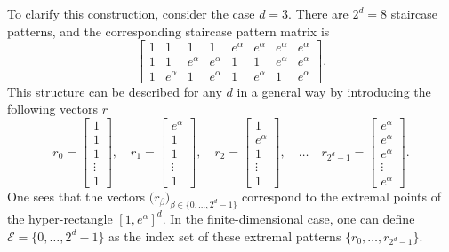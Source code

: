 \documentclass[a4paper, 11pt]{article}
\theoremstyle{definition}
\begin{document}
{To clarify this construction, consider the case $d = 3$. There are $2^d = 8$ staircase patterns, and the corresponding staircase pattern matrix is
\[
\begin{bmatrix}
1 & 1 & 1 & 1 & e^\alpha & e^\alpha & e^\alpha & e^\alpha \\
1 & 1 & e^\alpha & e^\alpha & 1 & 1 & e^\alpha & e^\alpha \\
1 & e^\alpha & 1 & e^\alpha & 1 & e^\alpha & 1 & e^\alpha
\end{bmatrix}.
\]
This structure can be described for any $d$ in a general way by introducing the following vectors $r$
\begin{equation}\label{eq: R_matrix_by_slice}
    r_0 = \begin{bmatrix} 1 \\ 1 \\ 1 \\ \vdots \\ 1 \end{bmatrix}, \quad
    r_1 = \begin{bmatrix} e^\alpha \\ 1 \\ 1 \\ \vdots \\ 1 \end{bmatrix}, \quad
    r_2 = \begin{bmatrix} 1 \\ e^\alpha \\ 1 \\ \vdots \\ 1 \end{bmatrix}, \quad \dots \quad
    r_{2^d - 1} = \begin{bmatrix} e^\alpha \\ e^\alpha \\ e^\alpha \\ \vdots \\ e^\alpha \end{bmatrix}.
\end{equation}
One sees that the vectors $\bigl(r_\beta\bigr)_{\beta \in \{0, \dots, 2^d - 1\}}$ correspond to the extremal points of the hyper-rectangle $[1, e^\alpha]^d$. In the finite-dimensional case, one can define $\mathcal{E} = \{0, \dots, 2^d - 1\}$ as the index set of these extremal patterns $\{r_0, \dots, r_{2^d - 1}\}$.  

}
\end{document}
